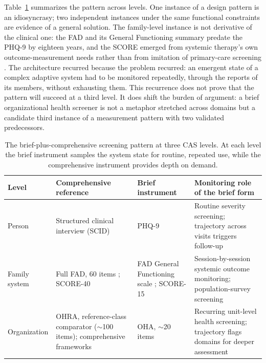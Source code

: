 \documentclass[12pt, letterpaper]{article}
\begin{document}
Table~\ref{tab:pairings} summarizes the pattern across levels. One instance of a design pattern is an idiosyncrasy; two independent instances under the same functional constraints are evidence of a general solution. The family-level instance is not derivative of the clinical one: the FAD and its General Functioning summary predate the PHQ-9 by eighteen years, and the SCORE emerged from systemic therapy's own outcome-measurement needs rather than from imitation of primary-care screening \parencite{epstein1983,kroenke2001,stratton2010}. The architecture recurred because the problem recurred: an emergent state of a complex adaptive system had to be monitored repeatedly, through the reports of its members, without exhausting them. This recurrence does not prove that the pattern will succeed at a third level. It does shift the burden of argument: a brief organizational health screener is not a metaphor stretched across domains but a candidate third instance of a measurement pattern with two validated predecessors.

\begin{table}[htbp]
\centering
\small
\caption{The brief-plus-comprehensive screening pattern at three CAS levels. At each level the brief instrument samples the system state for routine, repeated use, while the comprehensive instrument provides depth on demand.}
\label{tab:pairings}
\begin{tabular}{p{2.5cm}p{4.3cm}p{3.5cm}p{3.6cm}}
\toprule
Level & Comprehensive reference & Brief instrument & Monitoring role of the brief form \\
\midrule
Person & Structured clinical interview (SCID) \parencite{first1996} & PHQ-9 \parencite{kroenke2001} & Routine severity screening; trajectory across visits triggers follow-up \\
\midrule
Family system & Full FAD, 60 items \parencite{epstein1983,miller2000}; SCORE-40 \parencite{stratton2010} & FAD General Functioning scale \parencite{boterhovendehaan2015}; SCORE-15 \parencite{stratton2014} & Session-by-session systemic outcome monitoring; population-survey screening \\
\midrule
Organization & OHRA, reference-class comparator ($\sim$100 items); comprehensive frameworks \parencite{camp2024,denison1995} & OHA, $\sim$20 items \parencite{carr2025} & Recurring unit-level health screening; trajectory flags domains for deeper assessment \\
\bottomrule
\end{tabular}
\end{table}
\end{document}
